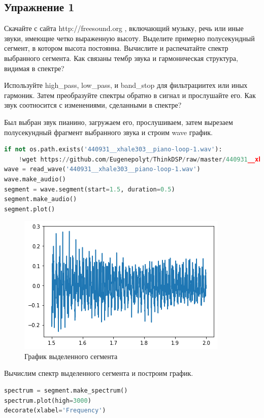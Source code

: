 \subsection{Упражнение 1}

Скачайте с сайта http://freesound.org , включающий музыку, речь или иные звуки, имеющие четко выраженную высоту. Выделите примерно полусекундный сегмент, в котором высота постоянна. Вычислите и распечатайте спектр выбранного сегмента. Как связаны тембр звука и гармоническая структура, видимая в спектре?


\noindent Используйте high\_pass, low\_pass, и band\_stop для фильтрациитех или иных гармоник. Затем преобразуйте спектры обратно в сигнал и прослушайте его. Как звук соотносится с изменениями, сделанными в спектре?
    

Был выбран звук пианино, загружаем его, прослушиваем, затем вырезаем полусекундный фрагмент выбранного звука и строим wave график.

\begin{lstlisting}[language=Python]
if not os.path.exists('440931__xhale303__piano-loop-1.wav'):
    !wget https://github.com/Eugenepolyt/ThinkDSP/raw/master/440931__xhale303__piano-loop-1.wav
wave = read_wave('440931__xhale303__piano-loop-1.wav')
wave.make_audio()
segment = wave.segment(start=1.5, duration=0.5)
segment.make_audio()
segment.plot()
\end{lstlisting}
    
\begin{figure}[H]
	\begin{center}
		\includegraphics[scale=1]{fig/lab01/lab01_1.png}
		\caption{График выделенного сегмента}
	\end{center}
\end{figure}

Вычислим спектр выделенного сегмента и построим график.
\begin{lstlisting}[language=Python]
spectrum = segment.make_spectrum()
spectrum.plot(high=3000)
decorate(xlabel='Frequency')
\end{lstlisting}


